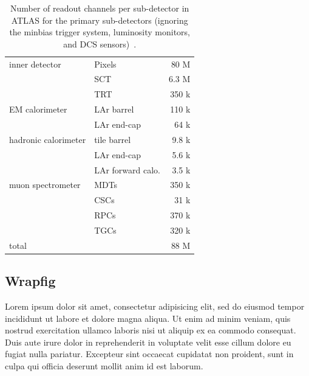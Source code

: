 
\begin{table}[bp]
    \centering
    \caption{
        Number of readout channels per sub-detector in ATLAS for the primary sub-detectors
        (ignoring the minbias trigger system, luminosity monitors,
        and DCS sensors)~\citep{2008.ATLAS.detector-paper}.
    }
    \begin{tabular}{l l r}
        \hline\hline
        inner detector        &  Pixels            &   80 M \\
                              &  SCT               &  6.3 M \\ 
                              &  TRT               &  350 k \\ 
        \hline                     
        EM calorimeter        &  LAr barrel        &  110 k \\
                              &  LAr end-cap       &   64 k \\ 
        \hline                     
        hadronic calorimeter  &  tile barrel       &  9.8 k \\
                              &  LAr end-cap       &  5.6 k \\ 
                              &  LAr forward calo. &  3.5 k \\ 
        \hline                     
        muon spectrometer     &  MDTs              &  350 k \\
                              &  CSCs              &   31 k \\ 
                              &  RPCs              &  370 k \\ 
                              &  TGCs              &  320 k \\ 
        \hline                     
        total                 &                    &   88 M \\
        \hline\hline               
    \end{tabular}
    \label{tab:ATLAS-channels-per-sub-detector}
\end{table}


\clearpage
\subsection{Wrapfig}

Lorem ipsum dolor sit amet, consectetur adipisicing elit, sed do eiusmod tempor
incididunt ut labore et dolore magna aliqua. Ut enim ad minim veniam, quis
nostrud exercitation ullamco laboris nisi ut aliquip ex ea commodo consequat.
Duis aute irure dolor in reprehenderit in voluptate velit esse cillum dolore
eu fugiat nulla pariatur. Excepteur sint occaecat cupidatat non proident, sunt
in culpa qui officia deserunt mollit anim id est laborum.

